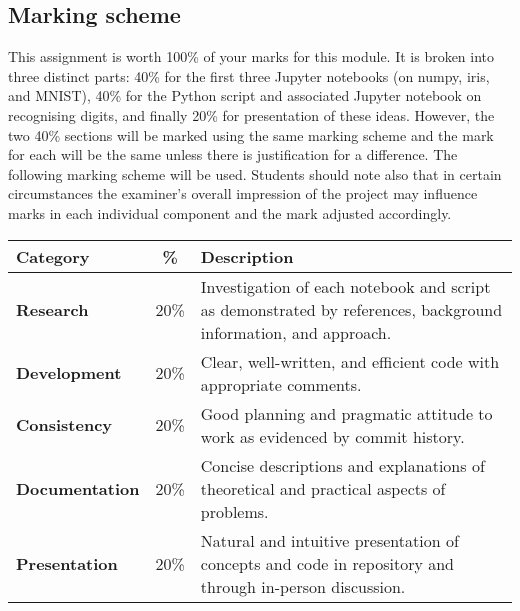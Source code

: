 \documentclass[12pt, a4paper]{article}
\begin{document}
\subsection*{Marking scheme}
This assignment is worth 100\% of your marks for this module.
It is broken into three distinct parts: 40\% for the first three Jupyter notebooks (on numpy, iris, and MNIST), 40\% for the Python script and associated Jupyter notebook on recognising digits, and finally 20\% for presentation of these ideas.
However, the two 40\% sections will be marked using the same marking scheme and the mark for each will be the same unless there is justification for a difference.
The following marking scheme will be used.
Students should note also that in certain circumstances the examiner's overall impression of the project may influence marks in each individual component and the mark adjusted accordingly.

\begin{center}
  \begin{tabular}{lcp{8.6cm}}
    \toprule
    \textbf{Category}      & \textbf{\%} & \textbf{Description} \\
    \midrule
    \textbf{Research}      & 20\%   & Investigation of each notebook and script as demonstrated by references, background information, and approach. \\
    \textbf{Development}   & 20\%   & Clear, well-written, and efficient code with appropriate comments. \\
    \textbf{Consistency}   & 20\%   & Good planning and pragmatic attitude to work as evidenced by commit history. \\
    \textbf{Documentation} & 20\%   & Concise descriptions and explanations of theoretical and practical aspects of problems. \\
    \textbf{Presentation}  & 20\%   & Natural and intuitive presentation of concepts and code in repository and through in-person discussion. \\
    \midrule
    \bottomrule
  \end{tabular}
\end{center}
\end{document}
